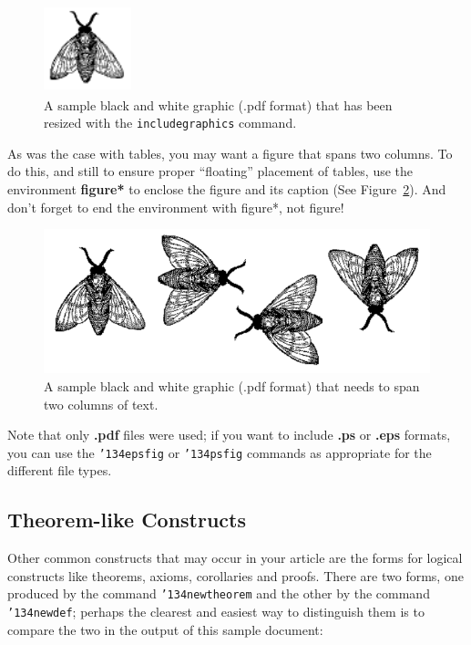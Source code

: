 \documentclass{vldb}
\begin{document}
\begin{figure}
\centering
\includegraphics[width=1in,height=1in]{fly}
\caption{A sample black and white graphic (.pdf format)
that has been resized with the \texttt{includegraphics} command.}
\label{fig:bigfly}
\end{figure}


As was the case with tables, you may want a figure
that spans two columns.  To do this, and still to
ensure proper ``floating'' placement of tables, use the environment
\textbf{figure*} to enclose the figure and its caption (See Figure~\ref{fig:flies}). And don't forget to end the environment with {figure*}, not {figure}!

\begin{figure}
\centering
\includegraphics{flies}
\caption{A sample black and white graphic (.pdf format)
that needs to span two columns of text.}
\label{fig:flies}
\end{figure}


Note that only {\textbf{.pdf}} files were used; if you want to include
{\textbf{.ps}} or {\textbf{.eps}} formats, you can use the
\texttt{{\char'134}epsfig} or \texttt{{\char'134}psfig}
commands as appropriate for the different file types.

\subsection{Theorem-like Constructs}
Other common constructs that may occur in your article are
the forms for logical constructs like theorems, axioms,
corollaries and proofs.  There are
two forms, one produced by the
command \texttt{{\char'134}newtheorem} and the
other by the command \texttt{{\char'134}newdef}; perhaps
the clearest and easiest way to distinguish them is
to compare the two in the output of this sample document:
\end{document}
